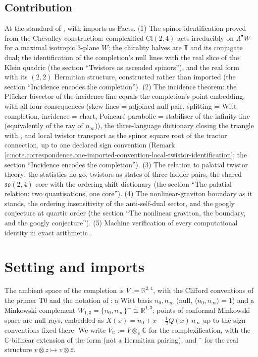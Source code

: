 \documentclass[11pt]{article}
\theoremstyle{definition}
\theoremstyle{plain}
\providecommand{\C}{}\renewcommand{\C}{\mathbb{C}}
\providecommand{\Cl}{}\renewcommand{\Cl}{\mathrm{Cl}}
\providecommand{\R}{}\renewcommand{\R}{\mathbb{R}}
\providecommand{\T}{}\renewcommand{\T}{\mathbb{T}}
\providecommand{\nInf}{}\renewcommand{\nInf}{n_\infty}
\providecommand{\nO}{}\renewcommand{\nO}{n_0}
\providecommand{\ip}{}\renewcommand{\ip}[2]{\langle #1, #2\rangle}
\begin{document}
\subsection*{Contribution}
\label{c:note.correspondence.setting-contribution}
At the standard of \cite{ButlerT1}, with imports as Facts. (1) The spinor identification proved from the Chevalley construction: complexified $\Cl(2,4)$ acts irreducibly on $\Lambda^\bullet W$ for a maximal isotropic 3-plane $W$; the chirality halves are $\T$ and its conjugate dual; the identification of the completion's null lines with the real slice of the Klein quadric (the section ``Twistors as ascended spinors''), and the real form with its $(2,2)$ Hermitian structure, constructed rather than imported (the section ``Incidence encodes the completion''). (2) The incidence theorem: the Pl\"ucker bivector of the incidence line equals the completion's point embedding, with all four consequences (skew lines = adjoined null pair, splitting = Witt completion, incidence = chart, Poincar\'e parabolic = stabiliser of the infinity line (equivalently of the ray of $\nInf$)), the three-language dictionary closing the triangle with \cite{ButlerT6}, and local twistor transport as the spinor square root of the tractor connection, up to one declared sign convention (Remark \ref{c:note.correspondence.one-imported-convention-local-twistor-identification}; the section ``Incidence encodes the completion''). (3) The relation to palatial twistor theory: the statistics no-go, twistors as states of three ladder pairs, the shared $\mathfrak{so}(2,4)$ core with the ordering-shift dictionary (the section ``The palatial relation: two quantisations, one core''). (4) The nonlinear-graviton boundary as it stands, the ordering insensitivity of the anti-self-dual sector, and the googly conjecture at quartic order (the section ``The nonlinear graviton, the boundary, and the googly conjecture''). (5) Machine verification of every computational identity in exact arithmetic \cite{ButlerVerifyT9}.

\section{Setting and imports}

\label{c:note.correspondence.setting-setting-imports}
The ambient space of the completion is $V := \R^{2,4}$, with the Clifford conventions of the primer T0 \cite{ButlerT0} and the notation of \cite{ButlerT6}: a Witt basis $\nO, \nInf$ (null, $\ip{\nO}{\nInf} = 1$) and a Minkowski complement $W_{1,3} = \{\nO, \nInf\}^\perp \cong \R^{1,3}$; points of conformal Minkowski space are null rays, embedded as $X(x) = \nO + x - \tfrac12Q(x)\,\nInf$ up to the sign conventions fixed there. We write $V_\C := V \otimes_\R \C$ for the complexification, with the $\C$-bilinear extension of the form (not a Hermitian pairing), and $\bar{\phantom{v}}$ for the real structure $v \otimes z \mapsto v \otimes \bar z$.
\end{document}

